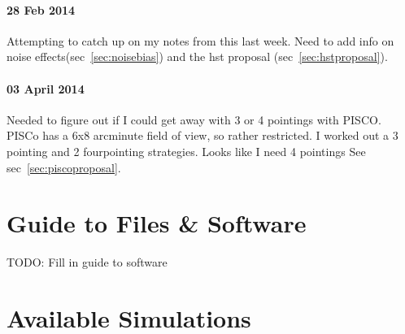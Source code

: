 \documentclass[11pt]{article}
\begin{document}
\paragraph{28 Feb 2014}
Attempting to catch up on my notes from this last week. Need to add info on noise effects(sec~\ref{sec:noisebias}) and the hst proposal (sec~\ref{sec:hstproposal}).


\paragraph{03 April 2014}
Needed to figure out if I could get away with 3 or 4 pointings with PISCO. PISCo has a 6x8 arcminute field of view, so rather restricted. I worked out a 3 pointing and 2 fourpointing strategies. Looks like I need 4 pointings See sec~\ref{sec:piscoproposal}.


\clearpage \newpage


\section{Guide to Files \& Software}

TODO: Fill in guide to software



\clearpage \newpage


\section{Available Simulations}
\end{document}
